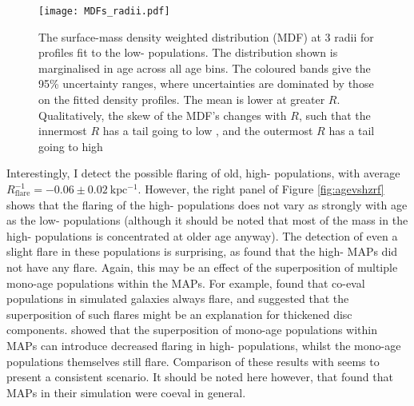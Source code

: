 \begin{figure}
	\texttt{[image: MDFs\_radii.pdf]}
 	\centering
   \caption[Surface-mass denisty weighted \feh{} distribution in 3 radial bins, as found from measurement of mono-age, mono-\feh{} populations in APOGEE DR12]{The surface-mass density weighted \feh{} distribution (MDF) at 3 radii for profiles fit to the low-\afe{} populations. The distribution shown is marginalised in age across all age bins. The coloured bands give the 95\% uncertainty ranges, where uncertainties are dominated by those on the fitted density profiles. The mean \feh{} is lower at greater $R$. Qualitatively, the skew of the MDF's changes with $R$, such that the innermost $R$ has a tail going to low \feh{}, and the outermost $R$ has a tail going to high \feh{}}
     \label{fig:mdf}
 \end{figure}

Interestingly, I detect the possible flaring of old, high-\afe{} populations, with average $R_{\mathrm{flare}}^{-1} = -0.06 \pm 0.02\ \mathrm{kpc^{-1}}$. However, the right panel of Figure \ref{fig:agevshzrf} shows that the flaring of the high-\afe{} populations does not vary as strongly with age as the low-\afe{} populations (although it should be noted that most of the mass in the high-\afe{} populations is concentrated at older age anyway). The detection of even a slight flare in these populations is surprising, as \citet{2016ApJ...823...30B} found that the high-\afe{} MAPs did not have any flare. Again, this may be an effect of the superposition of multiple mono-age populations within the MAPs. For example, \citet{2015ApJ...804L...9M} found that co-eval populations in simulated galaxies always flare, and suggested that the superposition of such flares might be an explanation for thickened disc components. \citet{2017ApJ...834...27M} showed that the superposition of mono-age populations within MAPs can introduce decreased flaring in high-\afe{} populations, whilst the mono-age populations themselves still flare. Comparison of these results with \citet{2016ApJ...823...30B} seems to present a consistent scenario. It should be noted here however, that \citet{2013MNRAS.436..625S} found that MAPs in their simulation were coeval in general.

